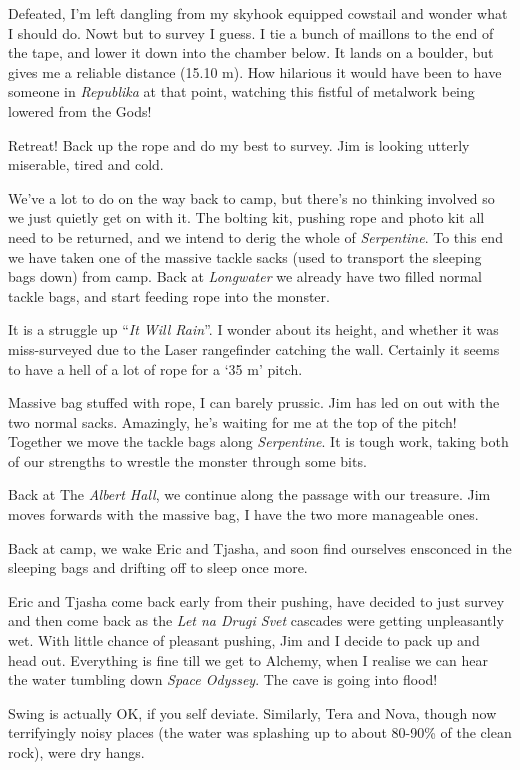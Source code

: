 Defeated, I'm left dangling from my skyhook equipped cowstail and wonder
what I should do. Nowt but to survey I guess. I tie a bunch of maillons
to the end of the tape, and lower it down into the chamber below. It
lands on a boulder, but gives me a reliable distance (15.10 m). How
hilarious it would have been to have someone in \emph{Republika} at that
point, watching this fistful of metalwork being lowered from the Gods!

Retreat! Back up the rope and do my best to survey. Jim is looking
utterly miserable, tired and cold.

We've a lot to do on the way back to camp, but there's no thinking
involved so we just quietly get on with it. The bolting kit, pushing
rope and photo kit all need to be returned, and we intend to derig the
whole of \emph{Serpentine}. To this end we have taken one of the massive
tackle sacks (used to transport the sleeping bags down) from camp. Back
at \emph{Longwater} we already have two filled normal tackle bags, and
start feeding rope into the monster.

It is a struggle up ``\emph{It Will Rain}''. I wonder about its height,
and whether it was miss-surveyed due to the Laser rangefinder catching
the wall. Certainly it seems to have a hell of a lot of rope for a `35
m' pitch.

Massive bag stuffed with rope, I can barely prussic. Jim has led on out
with the two normal sacks. Amazingly, he's waiting for me at the top of
the pitch! Together we move the tackle bags along \emph{Serpentine}. It
is tough work, taking both of our strengths to wrestle the monster
through some bits.

Back at The \emph{Albert Hall}, we continue along the passage with our
treasure. Jim moves forwards with the massive bag, I have the two more
manageable ones.

Back at camp, we wake Eric and Tjasha, and soon find ourselves ensconced
in the sleeping bags and drifting off to sleep once more.

Eric and Tjasha come back early from their pushing, have decided to just
survey and then come back as the \emph{Let na Drugi Svet} cascades were
getting unpleasantly wet. With little chance of pleasant pushing, Jim
and I decide to pack up and head out. Everything is fine till we get to
Alchemy, when I realise we can hear the water tumbling down \emph{Space
Odyssey}. The cave is going into flood!

Swing is actually OK, if you self deviate. Similarly, Tera and Nova,
though now terrifyingly noisy places (the water was splashing up to
about 80-90\% of the clean rock), were dry hangs.

